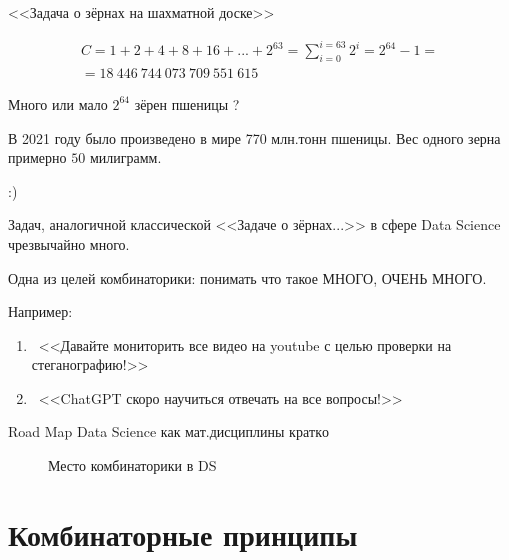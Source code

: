 \begin{frame}{<<Задача о зёрнах на шахматной доске>>}

\begin{equation*}
\begin{matrix}
C = 1 + 2 + 4 + 8 + 16 + ... + 2^{63} = \sum_{i=0}^{i=63} 2^i = 2^{64} - 1 = \\
= 18~446~744~073~709~551~615
\end{matrix}
\end{equation*}

Много или мало $2^{64}$ зёрен пшеницы ?

В 2021 году было произведено в мире 770 млн.тонн пшеницы.
Вес одного зерна примерно $50$ милиграмм.

 :)

\end{frame}

\begin{frame}
Задач, аналогичной классической 
<<Задаче о зёрнах...>>
в сфере Data Science чрезвычайно много.

Одна из целей комбинаторики:
понимать что такое МНОГО, ОЧЕНЬ МНОГО.

Например:
\begin{enumerate}
	\item ~<<Давайте мониторить все видео на youtube с целью проверки на стеганографию!>>
	\item ~<<ChatGPT скоро научиться отвечать на все вопросы!>>
\end{enumerate}
 	
\end{frame}


\begin{frame}
	Road Map Data Science как мат.дисциплины \(кратко\)
	\begin{center}
		\begin{figure}
			
			\caption{Место комбинаторики в DS}
		\end{figure}	
	\end{center}
	
\end{frame}

\section{Комбинаторные принципы}\label{section:principles}

